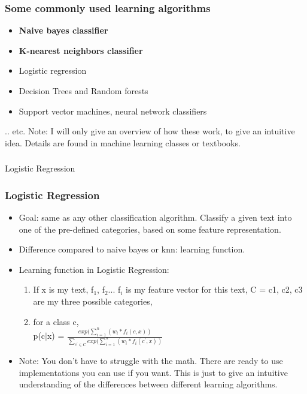\documentclass{beamer}
\begin{document}
\begin{frame}
\frametitle{Some commonly used learning algorithms}
\begin{itemize}
\item \textbf{Naive bayes classifier}
\item \textbf{K-nearest neighbors classifier}
\item Logistic regression
\item Decision Trees and Random forests
\item Support vector machines, neural network classifiers
\end{itemize}
.. etc. Note: I will only give an overview of how these work, to give an intuitive idea. Details are found in machine learning classes or textbooks. 
\end{frame}

\begin{frame}
\frametitle{} %
\Large Logistic Regression
\end{frame}

\begin{frame}
\frametitle{Logistic Regression}
\begin{itemize}
\item Goal: same as any other classification algorithm. Classify a given text into one of the pre-defined categories, based on some feature representation.
\item Difference compared to naive bayes or knn: learning function.
\item Learning function in Logistic Regression:
\begin{enumerate}
\item If x is my text, f$_1$, f$_2$... f$_i$ is my feature vector for this text, C = {c1, c2, c3} are my three possible categories, \pause
\item for a class c,\\ p(c$|$x) = $\frac{exp(\sum_{i=1}^n (w_i*f_i(c,x))} {\sum_{c^\prime \in C} exp(\sum_{i=1}^n (w_i*f_i(c^\prime,x))}$
\end{enumerate} \pause
\item Note: You don't have to struggle with the math. There are ready to use implementations you can use if you want. This is just to give an intuitive understanding of the differences between different learning algorithms.
\end{itemize}
\end{frame}
\end{document}
